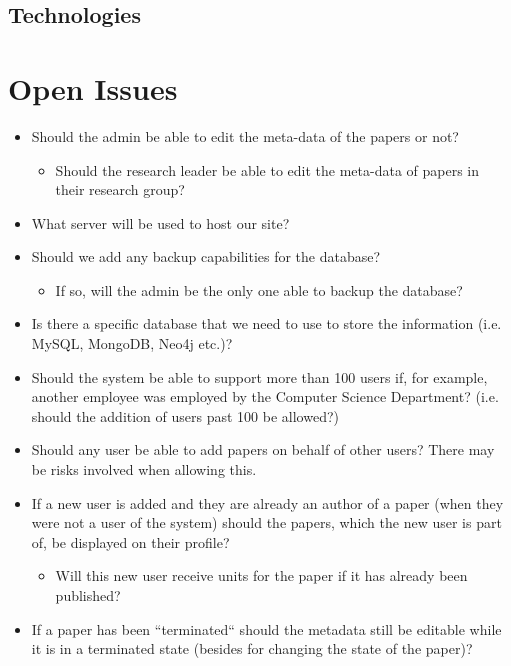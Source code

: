 \documentclass[a4paper,12pt]{article}
\begin{document}
\subsection{Technologies}

\newpage
\section{Open Issues}

\begin{itemize}	
\item Should the admin be able to edit the meta-data of the papers or not?
	\begin{itemize}
	\item Should the research leader be able to edit the meta-data of papers in their research group?
	\end{itemize}
\item What server will be used to host our site? 
\item Should we add any backup capabilities for the database?
	\begin{itemize}
	\item If so, will the admin be the only one able to backup the database?
	\end{itemize}
\item Is there a specific database that we need to use to store the information (i.e. MySQL, MongoDB, Neo4j etc.)?
\item Should the system be able to support more than 100 users if, for example, another employee was employed by the Computer Science Department? (i.e. should the addition of users past 100 be allowed?)
\item Should any user be able to add papers on behalf of other users? There may be risks involved when allowing this.
\item If a new user is added and they are already an author of a paper (when they were not a user of the system) should the papers, which the new user is part of, be displayed on their profile?
	\begin{itemize}
	\item Will this new user receive units for the paper if it has already been published?
	\end{itemize}
\item If a paper has been ``terminated`` should the metadata still be editable while it is in a terminated state (besides for changing the state of the paper)?
\end{itemize}
\end{document}
